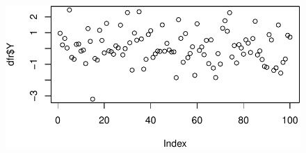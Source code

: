 \documentclass[
  letterpaper,
  DIV=11,
  numbers=noendperiod]{scrreprt}
\begin{document}
\begin{figure}[H]

{\centering \includegraphics{03_grafy_files/figure-pdf/unnamed-chunk-3-1.pdf}

}

\end{figure}
\end{document}
